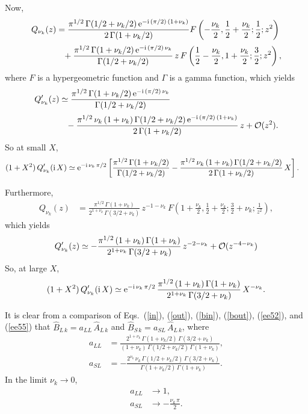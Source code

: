 \documentclass[12pt,prb,aps]{revtex4-1}
\begin{document}
Now,\cite{eda}
\begin{align}
Q_{\nu_k}(z)&= \frac{\pi^{1/2}\,\Gamma(1/2+\nu_k/2)\,{\rm e}^{-{\rm i}\,(\pi/2)\,(1+\nu_k)}}{2\,\Gamma(1+\nu_k/2)}F\left(-\frac{\nu_k}{2},\frac{1}{2}+\frac{\nu_k}{2};\frac{1}{2};z^2\right)\nonumber\\[0.5ex]
&\phantom{=}+\frac{\pi^{1/2}\,\Gamma(1+\nu_k/2)\,{\rm e}^{-{\rm i}\,(\pi/2)\,\nu_k}}{\Gamma(1/2+\nu_k/2)}\,z\,F\left(\frac{1}{2}-\frac{\nu_k}{2},1+\frac{\nu_k}{2};\frac{3}{2};z^2\right),
\end{align}
where $F$ is a hypergeometric function and $\Gamma$ is a gamma function,\cite{abramb,abramd}
which yields
\begin{align}
Q_{\nu_k}'(z)&\simeq\frac{\pi^{1/2}\,\Gamma(1+\nu_k/2)\,{\rm e}^{-{\rm i}\,(\pi/2)\,\nu_k}}{\Gamma(1/2+\nu_k/2)}\nonumber\\[0.5ex]
&\phantom{=}- \frac{\pi^{1/2}\,\nu_k\,(1+\nu_k)\,\Gamma(1/2+\nu_k/2)\,{\rm e}^{-{\rm i}\,(\pi/2)\,(1+\nu_k)}}{2\,\Gamma(1+\nu_k/2)}\,z +{\cal O}(z^2).
\end{align}
So at small $X$, 
\begin{align}\label{ee52}
(1+X^2)\,Q_{\nu_k}'({\rm i}\,X)&\simeq {\rm e}^{-{\rm i}\,\nu_k\,\pi/2}\left[\frac{\pi^{1/2}\,\Gamma(1+\nu_k/2)}{\Gamma(1/2+\nu_k/2)}
-\frac{\pi^{1/2}\,\nu_k\,(1+\nu_k)\,\Gamma(1/2+\nu_k/2)}{2\,\Gamma(1+\nu_k/2)}\,X\right]. 
\end{align}

Furthermore,\cite{eda}
\begin{align}
Q_{\nu_k}(z) &= \frac{\pi^{1/2}\,{\Gamma}(1+\nu_k)}{2^{1+\nu_k}\,\Gamma(3/2+\nu_k)}\,z^{-1-\nu_k}\,F\left(1+\frac{\nu_k}{2},\frac{1}{2}+\frac{\nu_k}{2};\frac{3}{2}+\nu_k;\frac{1}{z^2}\right),
\end{align}
which yields
\begin{align}
Q_{\nu_k}'(z)\simeq -\frac{\pi^{1/2}\,(1+\nu_k)\,{\Gamma}(1+\nu_k)}{2^{1+\nu_k}\,\Gamma(3/2+\nu_k)}\,z^{-2-\nu_k} + {\cal O}(z^{-4-\nu_k})
\end{align}
So, at large $X$, 
\begin{align}\label{ee55}
(1+X^2)\,Q_{\nu_k}'({\rm i}\,X) \simeq {\rm e}^{-{\rm i}\,\nu_k\,\pi/2}\,\frac{\pi^{1/2}\,(1+\nu_k)\,\Gamma(1+\nu_k)}{2^{1+\nu_k}\,\Gamma(3/2+\nu_k)}\,X^{-\nu_k}.
\end{align}

It is clear from a comparison of Eqs.~(\ref{in}), (\ref{out}), (\ref{bin}), (\ref{bout}), (\ref{ee52}), and (\ref{ee55}) that
$\hat{B}_{L\,k} = a_{LL}\,\hat{A}_{L\,k}$ and 
$\hat{B}_{S\,k}= a_{SL}\,\hat{A}_{L\,k}$,
where
\begin{align}
a_{LL} &= \frac{2^{1+\nu_k}\,\Gamma(1+\nu_k/2)\,\Gamma(3/2+\nu_k)}{(1+\nu_k)\,\Gamma(1/2+\nu_k/2)\,\Gamma(1+\nu_k)},\\[0.5ex]
a_{SL}&=- \frac{2^{\nu_k}\,\nu_k\,\Gamma(1/2+\nu_k/2)\,\Gamma(3/2+\nu_k)}{\Gamma(1+\nu_k/2)\,\Gamma(1+\nu_k)}.
\end{align}
In the limit $\nu_k\rightarrow 0$,
\begin{align}\label{ee32}
a_{LL}&\rightarrow 1,\\[0.5ex]
a_{SL} &\rightarrow - \frac{\nu_k\,\pi}{2}.\label{ee33}
\end{align}
\end{document}
